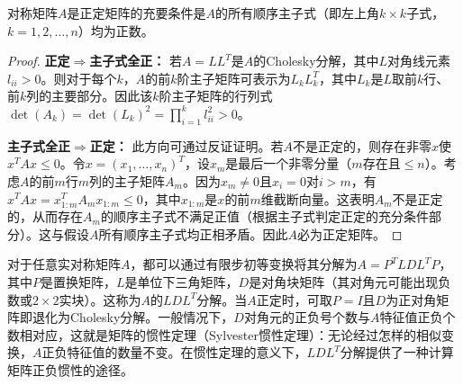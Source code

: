 \begin{corollary}[主子式判定准则]\label{cor:Sylvester}
	对称矩阵$A$是正定矩阵的充要条件是$A$的所有顺序主子式（即左上角$k\times k$子式，$k=1,2,\dots,n$）均为正数。
\end{corollary}
\begin{proof}
	\textbf{正定$\Rightarrow$主子式全正：} 若$A=LL^T$是$A$的Cholesky分解，其中$L$对角线元素$l_{ii}>0$。则对于每个$k$，$A$的前$k$阶主子矩阵可表示为$L_k L_k^T$，其中$L_k$是$L$取前$k$行、前$k$列的主要部分。因此该$k$阶主子矩阵的行列式$\det(A_k) = \det(L_k)^2 = \prod_{i=1}^k l_{ii}^2>0$。
	
	\textbf{主子式全正$\Rightarrow$正定：} 此方向可通过反证证明。若$A$不是正定的，则存在非零$x$使$x^T A x \le 0$。令$x=(x_1,\dots,x_n)^T$，设$x_m$是最后一个非零分量（$m$存在且$\le n$）。考虑$A$的前$m$行$m$列的主子矩阵$A_m$。因为$x_m\neq0$且$x_i=0$对$i>m$，有$x^T A x = x_{1:m}^T A_m x_{1:m} \le 0$，其中$x_{1:m}$是$x$的前$m$维截断向量。这表明$A_m$不是正定的，从而存在$A_m$的顺序主子式不满足正值（根据主子式判定正定的充分条件部分）。这与假设$A$所有顺序主子式均正相矛盾。因此$A$必为正定矩阵。
\end{proof}

\begin{note}
	对于任意实对称矩阵$A$，都可以通过有限步初等变换将其分解为$A=P^T L D L^T P$，其中$P$是置换矩阵，$L$是单位下三角矩阵，$D$是对角块矩阵（其对角元可能出现负数或$2\times 2$实块）。这称为$A$的$LDL^T$分解。当$A$正定时，可取$P=I$且$D$为正对角矩阵即退化为Cholesky分解。一般情况下，$D$对角元的正负号个数与$A$特征值正负个数相对应，这就是矩阵的惯性定理（Sylvester惯性定理）：无论经过怎样的相似变换，$A$正负特征值的数量不变。在惯性定理的意义下，$LDL^T$分解提供了一种计算矩阵正负惯性的途径。
\end{note}

